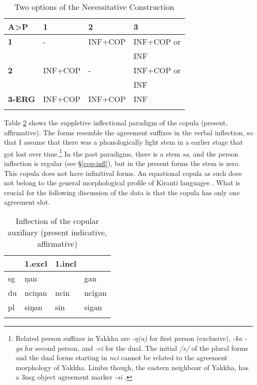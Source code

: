 \begin{table}
\centering
\begin{tabular}{llll}
\lsptoprule
{\bf A>P}&{\bf 1}&{\bf 2}&{\bf 3}\\
\midrule
 {\bf 1}	&-&INF+COP&INF+COP or\\
 &&&INF\\
 \midrule
 {\bf 2}&INF+COP&-&INF+COP or\\
 &&&INF\\
 \midrule
 {\bf 3-ERG}&INF+COP&INF+COP&INF\\
 \lspbottomrule
\end{tabular}
\caption{Two options of the Necessitative Construction}\label{cop-options}
\end{table}


Table \ref{copula} shows the suppletive inflectional paradigm of the copula (present, affirmative). The forms resemble the agreement suffixes in the verbal inflection, so that I assume that there was a phonologically light stem in a earlier stage that got lost over time.\footnote{Related person suffixes in Yakkha are \emph{-ŋ(a)} for first person (exclusive), \emph{-ka \ti -ga} for second person, and \emph{-ci} for the dual. The initial  \emph{/s/} of the plural  forms and the dual forms starting in \emph{nci} cannot be related to the agreement morphology of Yakkha. Limbu though, the eastern neighbour of Yakkha, has a 3nsg object agreement marker \emph{-si} \citep[76]{Driem1987A-grammar}.}  In the past paradigms, there is a stem \emph{sa}, and the person inflection is regular (see §\ref{cop-infl}), but in the present forms the stem is zero. This copula does not have infinitival forms. An equational copula as such does not belong to the general morphological profile of Kiranti languages \citep[276]{Bickel1999Nominalization}. What is crucial for the following discussion of the data is that the copula has only one agreement slot.

\begin{table}[htp]
\begin{center}
\begin{tabular}{llll}
\lsptoprule
&{\sc 1.excl}&{\sc 1.incl}&{\sc 2}\\
\midrule
{\sc sg}&  ŋan& &gan\\
{\sc du} & nciŋan&ncin& ncigan \\
{\sc pl}  & siŋan& sin&sigan\\
\lspbottomrule
\end{tabular}
\caption{Inflection of the copular auxiliary (present indicative, affirmative)}\label{copula}
\end{center}
\end{table}


